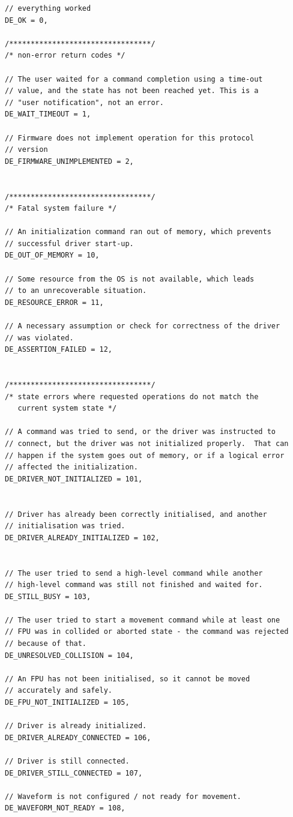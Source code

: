\documentclass[11pt,a4paper]{scrartcl}
\begin{document}
\begin{verbatim}
// everything worked
DE_OK = 0,

/*********************************/
/* non-error return codes */

// The user waited for a command completion using a time-out
// value, and the state has not been reached yet. This is a
// "user notification", not an error.
DE_WAIT_TIMEOUT = 1,

// Firmware does not implement operation for this protocol 
// version
DE_FIRMWARE_UNIMPLEMENTED = 2,


/*********************************/
/* Fatal system failure */

// An initialization command ran out of memory, which prevents
// successful driver start-up.
DE_OUT_OF_MEMORY = 10,

// Some resource from the OS is not available, which leads
// to an unrecoverable situation.
DE_RESOURCE_ERROR = 11,

// A necessary assumption or check for correctness of the driver
// was violated.
DE_ASSERTION_FAILED = 12,


/*********************************/
/* state errors where requested operations do not match the
   current system state */

// A command was tried to send, or the driver was instructed to
// connect, but the driver was not initialized properly.  That can
// happen if the system goes out of memory, or if a logical error
// affected the initialization.
DE_DRIVER_NOT_INITIALIZED = 101,


// Driver has already been correctly initialised, and another
// initialisation was tried.
DE_DRIVER_ALREADY_INITIALIZED = 102,


// The user tried to send a high-level command while another
// high-level command was still not finished and waited for.
DE_STILL_BUSY = 103,

// The user tried to start a movement command while at least one
// FPU was in collided or aborted state - the command was rejected
// because of that.
DE_UNRESOLVED_COLLISION = 104,

// An FPU has not been initialised, so it cannot be moved
// accurately and safely.
DE_FPU_NOT_INITIALIZED = 105,

// Driver is already initialized.
DE_DRIVER_ALREADY_CONNECTED = 106,

// Driver is still connected.
DE_DRIVER_STILL_CONNECTED = 107,

// Waveform is not configured / not ready for movement.
DE_WAVEFORM_NOT_READY = 108,


\end{verbatim}
\end{document}
